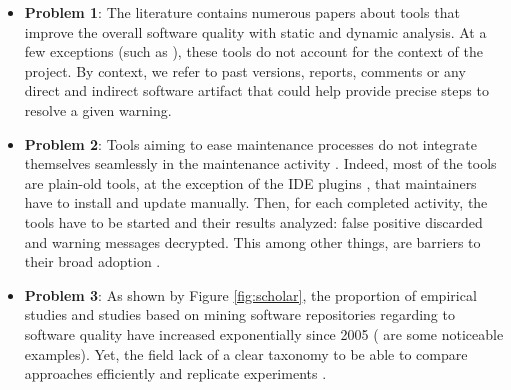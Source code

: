 \begin{itemize}

		\item {\bf Problem 1}: The literature contains numerous papers about tools that improve the overall software quality with static \cite{Dangel2000, burn2003checkstyle, Hovemeyer2007, Moha2010} and dynamic \cite{Nayrolles,Nayrolles2013a,Palma2013} analysis.
		At a few exceptions (such as \cite{Lopez2011, Montandon2013}), these tools do not account for the context of the project.
		By context, we refer to past versions, reports, comments or any direct and indirect software artifact that could help provide precise steps to resolve a given warning.

		\item {\bf Problem 2}: Tools aiming to ease maintenance processes do not integrate themselves seamlessly in the   maintenance activity	\cite{Kamiya2002a, Nayrolles, Nayrolles2013a, Jeffrey2009, Chen2013, Gavrilov2013, Jin2012, Nessa2008, Dallmeier, Nayrolles2015a, demange2013, Jiang2007, Iss2009}.
		Indeed, most of the tools are plain-old tools, at the exception of the IDE plugins \cite{Kamiya2002a, Hovemeyer2007}, that maintainers have to install and update manually.
		Then, for each completed activity, the tools have to be started and their results analyzed: false positive discarded and warning messages decrypted.
		This among other things, are barriers to their broad adoption \cite{Johnson2013,Lewis2013}.

		\item {\bf Problem 3}: As shown by Figure \ref{fig:scholar}, the proportion of empirical studies and studies based on mining software repositories regarding to software quality have increased exponentially since 2005 (\cite{Kim2011a,Lee2011a,Sun2011,Bhattacharya2011,Tian2012a,Zimmermann2012, Shang2013, Chen2014, McIntosh, Hemmati2015} are some noticeable examples).
		Yet, the field lack of a clear taxonomy to be able to compare approaches efficiently and replicate experiments \cite{Hassan2008,Godfrey2009}.


\end{itemize}
